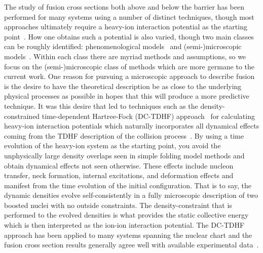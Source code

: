 The study of fusion cross sections both above and below the barrier has been performed for many systems using a number of distinct techniques, though most approaches ultimately require a heavy-ion interaction potential as the starting point~\citep{back2014}.
How one obtains such a potential is also varied, though two main classes can be roughly identified: phenomenological models~\citep{bass1974,randrup1978a,satchler1979,rhoadesbrown1983a,seiwert1984,adamian1996b,chamon2002,adamian2004,wang2012,zhu2016,bao2016,feng2017} and (semi-)microscopic models~\citep{brueckner1968,diaz-torres1999,diaz-torres2001b,moller2004,guo2004,guo2005,misicu2006,umar2006b,misicu2007,guo2007b,diaz-torres2007a,lu2014,simenel2017,diaz-torres2018}.
Within each class there are myriad methods and assumptions, so we focus on the (semi-)microscopic class of methods which are more germane to the current work.
One reason for pursuing a microscopic approach to describe fusion is the desire to have the theoretical description be as close to the underlying physical processes as possible in hopes that this will produce a more predictive technique.
It was this desire that led to techniques such as the density-constrained time-dependent Hartree-Fock (DC-TDHF) approach~\citep{umar2006b} for calculating heavy-ion interaction potentials which naturally incorporates all dynamical effects coming from the TDHF description of the collision process~\citep{simenel2018}.
By using a time evolution of the heavy-ion system as the starting point, you avoid the unphysically large density overlaps seen in simple folding model methods and obtain dynamical effects not seen otherwise.
These effects include nucleon transfer, neck formation, internal excitations, and deformation effects and manifest from the time evolution of the initial configuration.
That is to say, the dynamic densities evolve self-consistently in a fully microscopic description of two boosted nuclei with no outside constraints.
The density-constraint that is performed to the evolved densities is what provides the static collective energy which is then interpreted as the ion-ion interaction potential.
The DC-TDHF approach has been applied to many systems spanning the nuclear chart and the fusion cross section results generally agree well with available experimental data~\citep{umar2006a,umar2006d,umar2008b,umar2008a,umar2009b,umar2010c,oberacker2010,keser2012,umar2012a,umar2014a,godbey2017,godbey2019b}.

